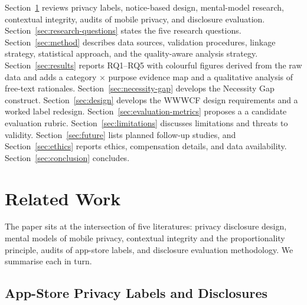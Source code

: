 \documentclass[11pt,a4paper]{article}
\makeatletter
\let\@oldsection\section
\renewcommand{\section}{\FloatBarrier\@oldsection}
\makeatother
\begin{document}
Section~\ref{sec:related-work} reviews privacy labels, notice-based
design, mental-model research, contextual integrity, audits of mobile
privacy, and disclosure evaluation.
Section~\ref{sec:research-questions} states the five research questions.
Section~\ref{sec:method} describes data sources, validation procedures,
linkage strategy, statistical approach, and the quality-aware analysis
strategy. Section~\ref{sec:results} reports RQ1--RQ5 with colourful
figures derived from the raw data and adds a category $\times$ purpose
evidence map and a qualitative analysis of free-text rationales.
Section~\ref{sec:necessity-gap} develops the Necessity Gap construct.
Section~\ref{sec:design} develops the WWWCF design requirements and a
worked label redesign. Section~\ref{sec:evaluation-metrics} proposes a
a candidate evaluation rubric. Section~\ref{sec:limitations} discusses
limitations and threats to validity. Section~\ref{sec:future} lists
planned follow-up studies, and Section~\ref{sec:ethics} reports ethics,
compensation details, and data availability. Section~\ref{sec:conclusion}
concludes.

\section{Related Work}
\label{sec:related-work}

The paper sits at the intersection of five literatures: privacy
disclosure design, mental models of mobile privacy, contextual integrity
and the proportionality principle, audits of app-store labels, and
disclosure evaluation methodology. We summarise each in turn.

\subsection{App-Store Privacy Labels and Disclosures}
\label{subsec:rw-labels}
\end{document}
